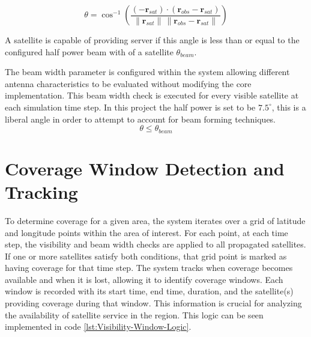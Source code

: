 \begin{equation}\label{eq:nadirAngle}
\theta = \cos^{-1}\!\left(
\frac{
(-\mathbf{r}_{sat}) \cdot (\mathbf{r}_{obs} - \mathbf{r}_{sat})
}{
\lVert \mathbf{r}_{sat} \rVert \, \lVert \mathbf{r}_{obs} - \mathbf{r}_{sat} \rVert
}
\right)
\end{equation}

A satellite is capable of providing server if this angle is less than or equal to the configured half power beam with of a satellite $\theta_{beam}.$ 

The beam width parameter is configured within the system allowing different antenna characteristics to be evaluated without modifying the core implementation. This beam width check is executed for every visible satellite at each simulation time step. In this project the half power is set to be $7.5^{\circ}$, this is a liberal angle in order to attempt to account for beam forming techniques. \cite{electronics13071349}
\begin{equation}
    \theta \leq \theta_{beam}
\end{equation}

\section{Coverage Window Detection and Tracking}
To determine coverage for a given area, the system iterates over a grid of latitude and longitude points within the area of interest. For each point, at each time step, the visibility and beam width checks are applied to all propagated satellites. If one or more satellites satisfy both conditions, that grid point is marked as having coverage for that time step. The system tracks when coverage becomes available and when it is lost, allowing it to identify coverage windows. Each window is recorded with its start time, end time, duration, and the satellite(s) providing coverage during that window. This information is crucial for analyzing the availability of satellite service in the region. This logic can be seen implemented in code \ref{lst:Visibility-Window-Logic}.

